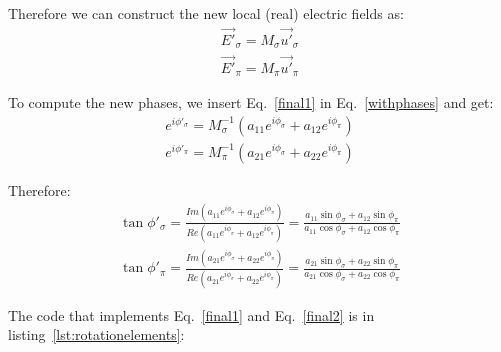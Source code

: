 \documentclass{iucr}
\begin{document}
Therefore we can construct the new local (real) electric fields as: 
\begin{eqnarray}
\label{final1}
\vec{E'}_\sigma = M_\sigma \vec{u'}_\sigma  \nonumber \\ 
\vec{E'}_\pi = M_\pi \vec{u'}_\pi  
\end{eqnarray}

To compute the new phases, we insert Eq.~\ref{final1} in Eq.~\ref{withphases} and get: 
\begin{eqnarray}
e^{i \phi'_\sigma} = M_\sigma^{-1} (a_{11} e^{i \phi_\sigma} + a_{12} e^{i \phi_\pi})  \nonumber \\ 
e^{i \phi'_\pi} =  M_\pi^{-1}      (a_{21} e^{i \phi_\sigma} + a_{22} e^{i \phi_\pi}) 
\end{eqnarray}

Therefore:
\begin{eqnarray}
\label{final2}
\tan{\phi'_\sigma} = \frac{Im(a_{11} e^{i \phi_\sigma} + a_{12} e^{i \phi_\pi})}
                          {Re(a_{11} e^{i \phi_\sigma} + a_{12} e^{i \phi_\pi})} = 
                          \frac{a_{11} \sin{\phi_\sigma} + a_{12} \sin{\phi_\pi}}
                               {a_{11} \cos{\phi_\sigma} + a_{12} \cos{\phi_\pi}}  \nonumber \\ 
\tan{\phi'_\pi} =  \frac{Im(a_{21} e^{i \phi_\sigma} + a_{22} e^{i \phi_\pi})}
                        {Re(a_{21} e^{i \phi_\sigma} + a_{22} e^{i \phi_\pi})} = 
                        \frac{a_{21} \sin{\phi_\sigma} + a_{22} \sin{\phi_\pi}}
                             {a_{21} \cos{\phi_\sigma} + a_{22} \cos{\phi_\pi}}
\end{eqnarray}


The code that implements Eq.~\ref{final1} and Eq.~\ref{final2} is in listing~\ref{lst:rotationelements}: 



\end{document}
